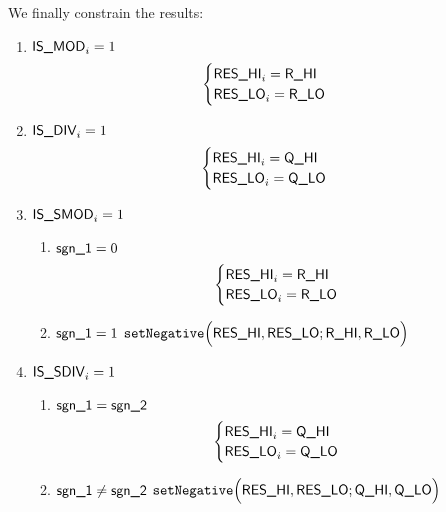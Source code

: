 We finally constrain the results:
\begin{enumerate}
	\item \If $\textsf{IS\_MOD}_{i} = 1$ \Then
		\[
			\begin{cases}
				\textsf{RES}\textsf{\_HI}_{i} = \textsf{R\_HI} \\
				\textsf{RES}\textsf{\_LO}_{i} = \textsf{R\_LO} \\
			\end{cases}
		\]
	\item \If $\textsf{IS\_DIV}_{i} = 1$ \Then 
		\[
			\begin{cases}
				\textsf{RES}\textsf{\_HI}_{i} = \textsf{Q\_HI} \\
				\textsf{RES}\textsf{\_LO}_{i} = \textsf{Q\_LO} \\
			\end{cases}
		\]
	\item \If $\textsf{IS\_SMOD}_{i} = 1$ \Then
		\begin{enumerate}
			\item \If $\textsf{sgn\_1} = 0$ \Then
				\[
					\begin{cases}
						\textsf{RES}\textsf{\_HI}_{i} = \textsf{R\_HI} \\
						\textsf{RES}\textsf{\_LO}_{i} = \textsf{R\_LO} \\
					\end{cases}
				\]
			\item \If $\textsf{sgn\_1} = 1$ \Then
				$\texttt{setNegative}
				\Big(
				\textsf{RES}\textsf{\_HI}, \textsf{RES}\textsf{\_LO};
				\textsf{R\_HI}, \textsf{R\_LO}
				\Big)$
		\end{enumerate}
	\item \If $\textsf{IS\_SDIV}_{i} = 1$ \Then
		\begin{enumerate}
			\item \If $\textsf{sgn\_1} = \textsf{sgn\_2}$ \Then
				\[
					\begin{cases}
						\textsf{RES}\textsf{\_HI}_{i} = \textsf{Q\_HI} \\
						\textsf{RES}\textsf{\_LO}_{i} = \textsf{Q\_LO} \\
					\end{cases}
				\]
			\item \If $\textsf{sgn\_1} \neq \textsf{sgn\_2}$ \Then
				$\texttt{setNegative}
				\Big(
				\textsf{RES}\textsf{\_HI}, \textsf{RES}\textsf{\_LO};
				\textsf{Q\_HI}, \textsf{Q\_LO}
				\Big)$
		\end{enumerate}
\end{enumerate}
